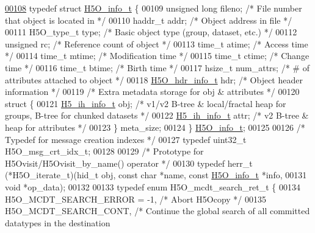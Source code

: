 \begin{DoxyCode}
\hyperlink{struct_h5_o__info__t}{00108} \textcolor{keyword}{typedef} \textcolor{keyword}{struct }\hyperlink{struct_h5_o__info__t}{H5O\_info\_t} \{
00109     \textcolor{keywordtype}{unsigned} \textcolor{keywordtype}{long}   fileno;     \textcolor{comment}{/* File number that object is located in */}
00110     haddr\_t         addr;       \textcolor{comment}{/* Object address in file   */}
00111     H5O\_type\_t      type;       \textcolor{comment}{/* Basic object type (group, dataset, etc.) */}
00112     \textcolor{keywordtype}{unsigned}        rc;     \textcolor{comment}{/* Reference count of object    */}
00113     time\_t      atime;      \textcolor{comment}{/* Access time          */}
00114     time\_t      mtime;      \textcolor{comment}{/* Modification time        */}
00115     time\_t      ctime;      \textcolor{comment}{/* Change time          */}
00116     time\_t      btime;      \textcolor{comment}{/* Birth time           */}
00117     hsize\_t         num\_attrs;  \textcolor{comment}{/* # of attributes attached to object */}
00118     \hyperlink{struct_h5_o__hdr__info__t}{H5O\_hdr\_info\_t}      hdr;            \textcolor{comment}{/* Object header information */}
00119     \textcolor{comment}{/* Extra metadata storage for obj & attributes */}
00120     \textcolor{keyword}{struct }\{
00121         \hyperlink{struct_h5__ih__info__t}{H5\_ih\_info\_t}   obj;             \textcolor{comment}{/* v1/v2 B-tree & local/fractal heap for groups, B-tree
       for chunked datasets */}
00122         \hyperlink{struct_h5__ih__info__t}{H5\_ih\_info\_t}   attr;            \textcolor{comment}{/* v2 B-tree & heap for attributes */}
00123     \} meta\_size;
00124 \} \hyperlink{struct_h5_o__info__t}{H5O\_info\_t};
00125 
00126 \textcolor{comment}{/* Typedef for message creation indexes */}
00127 \textcolor{keyword}{typedef} uint32\_t H5O\_msg\_crt\_idx\_t;
00128 
00129 \textcolor{comment}{/* Prototype for H5Ovisit/H5Ovisit\_by\_name() operator */}
00130 \textcolor{keyword}{typedef} herr\_t (*H5O\_iterate\_t)(hid\_t obj, \textcolor{keyword}{const} \textcolor{keywordtype}{char} *name, \textcolor{keyword}{const} \hyperlink{struct_h5_o__info__t}{H5O\_info\_t} *info,
00131     \textcolor{keywordtype}{void} *op\_data);
00132 
00133 \textcolor{keyword}{typedef} \textcolor{keyword}{enum} H5O\_mcdt\_search\_ret\_t \{
00134     H5O\_MCDT\_SEARCH\_ERROR = -1, \textcolor{comment}{/* Abort H5Ocopy */}
00135     H5O\_MCDT\_SEARCH\_CONT,   \textcolor{comment}{/* Continue the global search of all committed datatypes in the destination
}
\end{DoxyCode}
